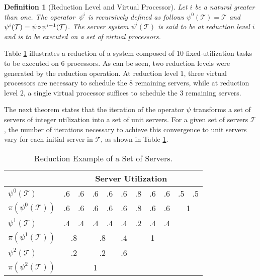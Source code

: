 \documentclass[twocolumn, compsocconf]{IEEEtran}
\newtheorem{definition}{Definition}[section]
\newcommand{\comp}{\mbox{\ensuremath{\mspace{2mu}\circ\mspace{2mu}}}}
\newcommand{\reduc}{\ensuremath{\psi}}\newcommand{\reducMap}{\ensuremath{\psi}}\newcommand{\util}{\ensuremath{\mu}\xspace}
\newcommand{\pack}{\ensuremath{\pi}}
\newcommand{\servSet}{\ensuremath{\mathcal{T}}}
\newcounter{proc}
\begin{document}
\begin{definition}[Reduction Level and Virtual Processor]\label{dfn:virtalProc}
  Let $i$ be a natural greater than one. The operator $\,\reduc^i$ is
  recursively defined as follows $\reduc^0(\servSet) = \servSet$ and
  $\reduc^{i}(\servSet) = \reduc \comp \reduc^{i-1}(\servSet)$. The server
  system $\reduc^i(\servSet)$ is said to be at reduction level $i$ and is to be
  executed on a set of virtual processors.
\end{definition}

Table \ref{tab:reducExample} illustrates a reduction of a system composed of
$10$ fixed-utilization tasks to be executed on $6$ processors. As can be
seen, two reduction levels were generated by the reduction operation. At
reduction level $1$, three virtual processors are necessary to schedule the $8$
remaining servers, while at reduction level $2$, a single virtual processor
suffices to schedule the $3$ remaining servers.

The next theorem states that the iteration of the operator $\reduc$ transforms a
set of servers of integer utilization into a set of unit servers. For a given
set of servers $\servSet$, the number of iterations necessary to achieve this
convergence to unit servers vary for each initial server in $\servSet$, as shown
in Table \ref{tab:reducExample}.

\setlength{\tabcolsep}{0.5em}
\begin{table}
  \centering
\caption{Reduction Example of a Set of Servers.\label{tab:reducExample}}
  \begin{tabular}{|l|c|c|c|c|c|c|c|c|c|c|}
    \hline  \rule{0cm}{.4cm}
    & \multicolumn{10}{c|}{Server Utilization \rule{0cm}{.4cm}} \\
    \hline 
    $\reduc^0(\servSet)$ \rule{0cm}{.35cm} & .6 & .6 & .6 & .6 & .6 & .8 & .6 & .6 & .5 & .5 \\
    \hline 
    $\pack(\reduc^0(\servSet))$ \rule{0cm}{.35cm} & .6 & .6 & .6 & .6 & .6 & .8 & .6 & .6 & 
    \multicolumn{2}{c|}{1} \\
    \hline  
    $\reduc^1(\servSet)$ \rule{0cm}{.35cm} & .4 & .4 & .4 & .4 & .4 & .2 & .4 & .4 \\
    \cline{1-9}
    $\pack (\reduc^1(\servSet))$ \rule{0cm}{.35cm} & \multicolumn{2}{c|}{.8} & 
    \multicolumn{2}{c|}{.8} & .4 & \multicolumn{3}{c|}{1} \\
    \cline{1-9}
    $\reduc^2(\servSet)$ \rule{0cm}{.35cm} & \multicolumn{2}{c|}{.2} & 
    \multicolumn{2}{c|}{.2} & .6 \\
    \cline{1-6} 
    $\pack (\reduc^2(\servSet))$ & \multicolumn{5}{c|}{ \rule{0cm}{.35cm} 1}\\
    \cline{1-6}
  \end{tabular}
\end{table}
\end{document}
